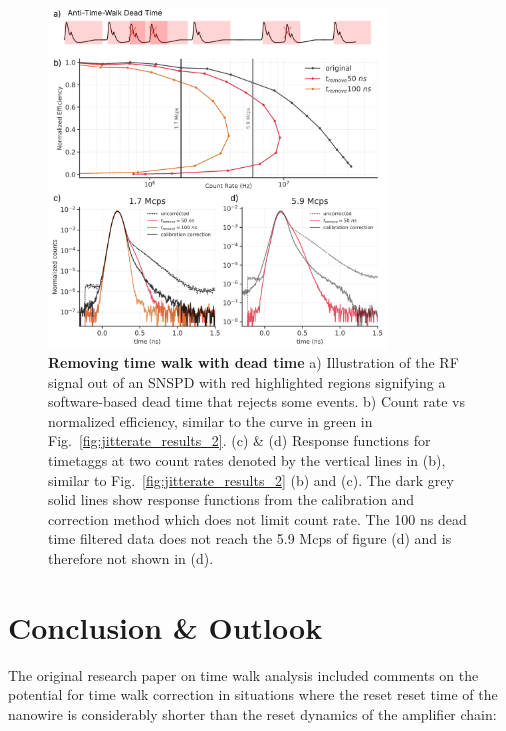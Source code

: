 \documentclass[11pt]{caltech_thesis} %
\begin{document}
\hypertarget{fig:dead_time}{%
\begin{figure}
\centering
\includegraphics[width=0.8\textwidth,height=\textheight]{./chapter_03/figs/cut_count_rate_v2_light.pdf}
\caption[{Removing time walk with dead time}]{\textbf{Removing time walk with dead time} a) Illustration of the RF signal out of an SNSPD with red highlighted regions signifying a software-based dead time that rejects some events. b) Count rate vs normalized efficiency, similar to the curve in green in Fig.~\ref{fig:jitterate_results_2}. (c) \& (d) Response functions for timetaggs at two count rates denoted by the vertical lines in (b), similar to Fig.~\ref{fig:jitterate_results_2} (b) and (c). The dark grey solid lines show response functions from the calibration and correction method which does not limit count rate. The 100 ns dead time filtered data does not reach the 5.9 Mcps of figure (d) and is therefore not shown in (d).}
\label{fig:dead_time}
\end{figure}
}

\hypertarget{conclusion-outlook}{%
\section{Conclusion \& Outlook}\label{conclusion-outlook}}

The original research paper on time walk analysis \autocite{Mueller2023} included comments on the potential for time walk correction in situations where the reset reset time of the nanowire is considerably shorter than the reset dynamics of the amplifier chain:
\end{document}

